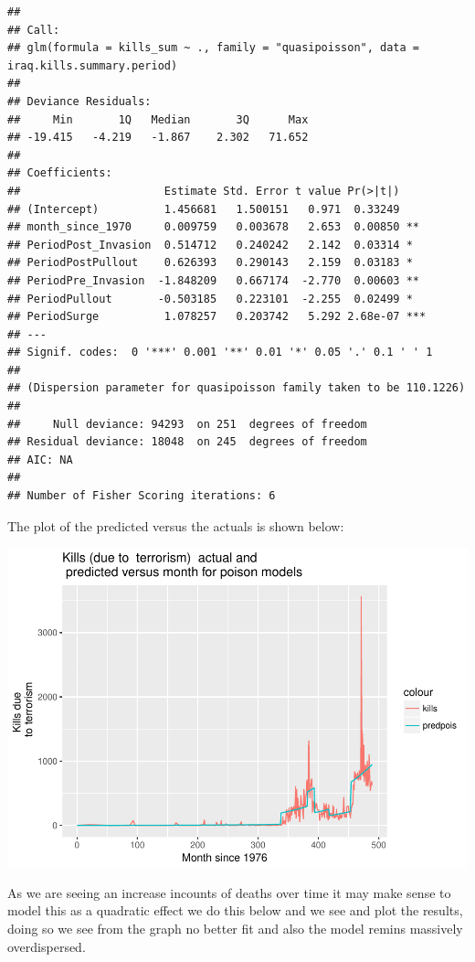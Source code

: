 \documentclass[]{article}
\begin{document}
\begin{verbatim}
## 
## Call:
## glm(formula = kills_sum ~ ., family = "quasipoisson", data = iraq.kills.summary.period)
## 
## Deviance Residuals: 
##     Min       1Q   Median       3Q      Max  
## -19.415   -4.219   -1.867    2.302   71.652  
## 
## Coefficients:
##                      Estimate Std. Error t value Pr(>|t|)    
## (Intercept)          1.456681   1.500151   0.971  0.33249    
## month_since_1970     0.009759   0.003678   2.653  0.00850 ** 
## PeriodPost_Invasion  0.514712   0.240242   2.142  0.03314 *  
## PeriodPostPullout    0.626393   0.290143   2.159  0.03183 *  
## PeriodPre_Invasion  -1.848209   0.667174  -2.770  0.00603 ** 
## PeriodPullout       -0.503185   0.223101  -2.255  0.02499 *  
## PeriodSurge          1.078257   0.203742   5.292 2.68e-07 ***
## ---
## Signif. codes:  0 '***' 0.001 '**' 0.01 '*' 0.05 '.' 0.1 ' ' 1
## 
## (Dispersion parameter for quasipoisson family taken to be 110.1226)
## 
##     Null deviance: 94293  on 251  degrees of freedom
## Residual deviance: 18048  on 245  degrees of freedom
## AIC: NA
## 
## Number of Fisher Scoring iterations: 6
\end{verbatim}

The plot of the predicted versus the actuals is shown below:

\includegraphics{Peters_experiment_markdown_files/figure-latex/unnamed-chunk-19-1.pdf}

As we are seeing an increase incounts of deaths over time it may make
sense to model this as a quadratic effect we do this below and we see
and plot the results, doing so we see from the graph no better fit and
also the model remins massively overdispersed.
\end{document}

